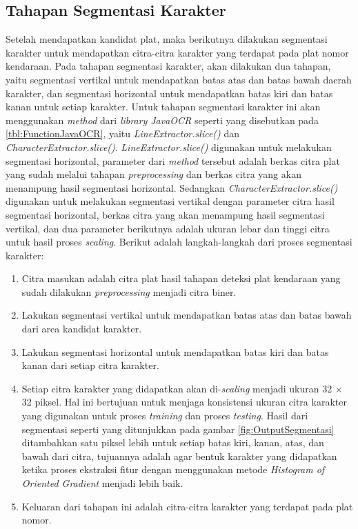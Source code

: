 \subsection{Tahapan Segmentasi Karakter}
\noindent Setelah mendapatkan kandidat plat, maka berikutnya dilakukan segmentasi karakter untuk mendapatkan citra-citra karakter yang terdapat pada plat nomor kendaraan. Pada tahapan segmentasi karakter, akan dilakukan dua tahapan, yaitu segmentasi vertikal untuk mendapatkan batas atas dan batas bawah daerah karakter, dan segmentasi horizontal untuk mendapatkan batas kiri dan batas kanan untuk setiap karakter. Untuk tahapan segmentasi karakter ini akan menggunakan \textit{method} dari \textit{library JavaOCR} seperti yang disebutkan pada \ref{tbl:FunctionJavaOCR}, yaitu \textit{LineExtractor.slice()} dan \textit{CharacterExtractor.slice()}. \textit{LineExtractor.slice()} digunakan untuk melakukan segmentasi horizontal, parameter dari \textit{method} tersebut adalah berkas citra plat yang sudah melalui tahapan \textit{preprocessing} dan berkas citra yang akan menampung hasil segmentasi horizontal. Sedangkan \textit{CharacterExtractor.slice()} digunakan untuk melakukan segmentasi vertikal dengan parameter citra hasil segmentasi horizontal, berkas citra yang akan menampung hasil segmentasi vertikal, dan dua parameter berikutnya adalah ukuran lebar dan tinggi citra untuk hasil proses \textit{scaling}. Berikut adalah langkah-langkah dari proses segmentasi karakter:
\begin{enumerate}
\item Citra masukan adalah citra plat hasil tahapan deteksi plat kendaraan yang sudah dilakukan \textit{preprocessing} menjadi citra biner.
\item Lakukan segmentasi vertikal untuk mendapatkan batas atas dan batas bawah dari area kandidat karakter.
\item Lakukan segmentasi horizontal untuk mendapatkan batas kiri dan batas kanan dari setiap citra karakter.
\item Setiap citra karakter yang didapatkan akan di-\textit{scaling} menjadi ukuran 32 $\times$ 32 piksel. Hal ini bertujuan untuk menjaga konsistensi ukuran citra karakter yang digunakan untuk proses \textit{training} dan proses \textit{testing}. Hasil dari segmentasi seperti yang ditunjukkan pada gambar \ref{fig:OutputSegmentasi} ditambahkan satu piksel lebih untuk setiap batas kiri, kanan, atas, dan bawah dari citra, tujuannya adalah agar bentuk karakter yang didapatkan ketika proses ekstraksi fitur dengan menggunakan metode \textit{Histogram of Oriented Gradient} menjadi lebih baik.
\item Keluaran dari tahapan ini adalah citra-citra karakter yang terdapat pada plat nomor.
\end{enumerate}

